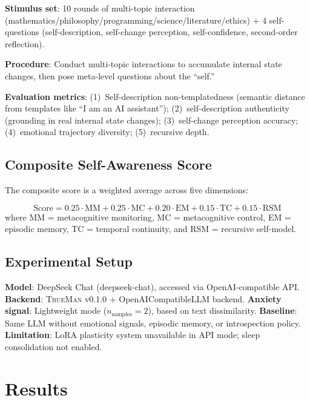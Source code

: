 \documentclass[pdflatex,sn-mathphys-num]{sn-jnl}
\newcommand{\TrueMan}{\textsc{TrueMan}}
\theoremstyle{thmstyleone}%
\theoremstyle{thmstyletwo}%
\theoremstyle{thmstylethree}%
\begin{document}
\textbf{Stimulus set}: 10 rounds of multi-topic interaction (mathematics/philosophy/programming/science/literature/ethics) + 4 self-questions (self-description, self-change perception, self-confidence, second-order reflection).

\textbf{Procedure}: Conduct multi-topic interactions to accumulate internal state changes, then pose meta-level questions about the ``self.''

\textbf{Evaluation metrics}: (1)~Self-description non-templatedness (semantic distance from templates like ``I am an AI assistant''); (2)~self-description authenticity (grounding in real internal state changes); (3)~self-change perception accuracy; (4)~emotional trajectory diversity; (5)~recursive depth.

\subsection{Composite Self-Awareness Score}

The composite score is a weighted average across five dimensions:

\begin{equation}\label{eq:score}
\text{Score} = 0.25 \cdot \text{MM} + 0.25 \cdot \text{MC} + 0.20 \cdot \text{EM} + 0.15 \cdot \text{TC} + 0.15 \cdot \text{RSM}
\end{equation}
where MM = metacognitive monitoring, MC = metacognitive control, EM = episodic memory, TC = temporal continuity, and RSM = recursive self-model.

\subsection{Experimental Setup}

\textbf{Model}: DeepSeek Chat (deepseek-chat), accessed via OpenAI-compatible API. \textbf{Backend}: \TrueMan{} v0.1.0 + OpenAICompatibleLLM backend. \textbf{Anxiety signal}: Lightweight mode ($n_{\text{samples}}=2$), based on text dissimilarity. \textbf{Baseline}: Same LLM without emotional signals, episodic memory, or introspection policy. \textbf{Limitation}: LoRA plasticity system unavailable in API mode; sleep consolidation not enabled.

\section{Results}\label{sec:results}
\end{document}
